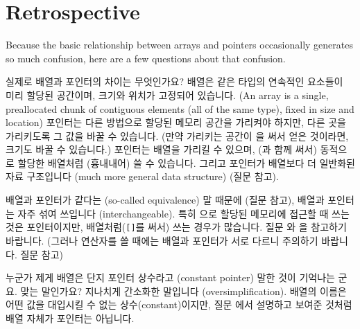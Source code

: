 \section{Retrospective}
Because the basic relationship between arrays and pointers occasionally
generates so much confusion, here are a few questions about that confusion.

\begin{faq}
	실제로 배열과 포인터의 차이는 무엇인가요?
\A
	배열은 같은 타입의 연속적인 요소들이 미리 할당된 공간이며,
	크기와 위치가 고정되어 있습니다. (An array is a single, preallocated
	chunk of contiguous elements (all of the same type), fixed in size
	and location)
	포인터는 다른 방법으로 할당된 메모리 공간을 가리켜야 하지만,
	다른 곳을 가리키도록 그 값을 바꿀 수 있습니다. (만약 가리키는 공간이
	을 써서 얻은 것이라면, 크기도 바꿀 수 있습니다.)
	포인터는 배열을 가리킬 수 있으며, (과 함께 써서) 동적으로
	할당한 배열처럼 (흉내내어) 쓸 수 있습니다. 그리고 포인터가 배열보다
	더 일반화된 자료 구조입니다 (much more general data structure)
	(질문  참고).

	배열과 포인터가 같다는 (so-called equivalence) 말 때문에
	(질문  참고), 배열과 포인터는 자주 섞여 쓰입니다 (interchangeable).
	특히 으로 할당된 메모리에 접근할
	때 쓰는 것은 포인터이지만, 배열처럼(\verb+[]+를 써서) 쓰는 경우가
	많습니다.  질문 와 을 참고하기 바랍니다.  (그러나 
	연산자를 쓸 때에는 배열과 포인터가 서로 다르니 주의하기 바랍니다.
	질문  참고)

\end{faq}

\begin{faq}
	누군가 제게 배열은 단지 포인터 상수라고 (constant pointer) 말한 것이
	기억나는 군요.	맞는 말인가요?
\A
	지나치게 간소화한 말입니다 (oversimplification). 
	배열의 이름은 어떤 값을 대입시킬 수 없는
	상수(constant)이지만, 질문 에서 설명하고 보여준 것처럼 배열 자체가
	포인터는 아닙니다.  
\end{faq}


